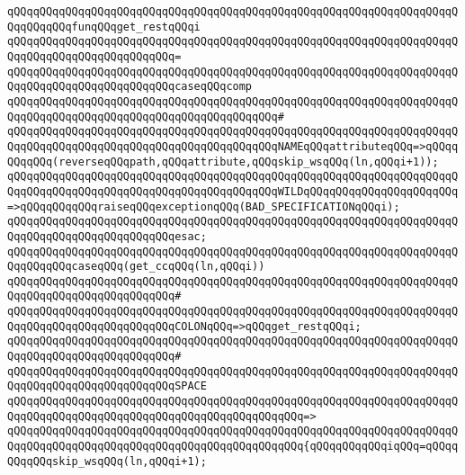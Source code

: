 \newline
\verb|qQQqqQQqqQQqqQQqqQQqqQQqqQQqqQQqqQQqqQQqqQQqqQQqqQQqqQQqqQQqqQQqqQQqqQQqqQQqqQQqfunqQQqget_restqQQqi|\newline
\verb|qQQqqQQqqQQqqQQqqQQqqQQqqQQqqQQqqQQqqQQqqQQqqQQqqQQqqQQqqQQqqQQqqQQqqQQqqQQqqQQqqQQqqQQqqQQqqQQq=|\newline
\verb|qQQqqQQqqQQqqQQqqQQqqQQqqQQqqQQqqQQqqQQqqQQqqQQqqQQqqQQqqQQqqQQqqQQqqQQqqQQqqQQqqQQqqQQqqQQqqQQqcaseqQQqcomp|\newline
\verb|qQQqqQQqqQQqqQQqqQQqqQQqqQQqqQQqqQQqqQQqqQQqqQQqqQQqqQQqqQQqqQQqqQQqqQQqqQQqqQQqqQQqqQQqqQQqqQQqqQQqqQQqqQQqqQQq#|\newline
\verb|qQQqqQQqqQQqqQQqqQQqqQQqqQQqqQQqqQQqqQQqqQQqqQQqqQQqqQQqqQQqqQQqqQQqqQQqqQQqqQQqqQQqqQQqqQQqqQQqqQQqqQQqqQQqqQQqNAMEqQQqattributeqQQq=>qQQqqQQqqQQq(reverseqQQqpath,qQQqattribute,qQQqskip_wsqQQq(ln,qQQqi+1));|\newline
\verb|qQQqqQQqqQQqqQQqqQQqqQQqqQQqqQQqqQQqqQQqqQQqqQQqqQQqqQQqqQQqqQQqqQQqqQQqqQQqqQQqqQQqqQQqqQQqqQQqqQQqqQQqqQQqqQQqWILDqQQqqQQqqQQqqQQqqQQqqQQq=>qQQqqQQqqQQqraiseqQQqexceptionqQQq(BAD_SPECIFICATIONqQQqi);|\newline
\verb|qQQqqQQqqQQqqQQqqQQqqQQqqQQqqQQqqQQqqQQqqQQqqQQqqQQqqQQqqQQqqQQqqQQqqQQqqQQqqQQqqQQqqQQqqQQqqQQqesac;|\newline
\newline
\verb|qQQqqQQqqQQqqQQqqQQqqQQqqQQqqQQqqQQqqQQqqQQqqQQqqQQqqQQqqQQqqQQqqQQqqQQqqQQqqQQqcaseqQQq(get_ccqQQq(ln,qQQqi))|\newline
\verb|qQQqqQQqqQQqqQQqqQQqqQQqqQQqqQQqqQQqqQQqqQQqqQQqqQQqqQQqqQQqqQQqqQQqqQQqqQQqqQQqqQQqqQQqqQQqqQQq#|\newline
\verb|qQQqqQQqqQQqqQQqqQQqqQQqqQQqqQQqqQQqqQQqqQQqqQQqqQQqqQQqqQQqqQQqqQQqqQQqqQQqqQQqqQQqqQQqqQQqqQQqCOLONqQQq=>qQQqget_restqQQqi;|\newline
\verb|qQQqqQQqqQQqqQQqqQQqqQQqqQQqqQQqqQQqqQQqqQQqqQQqqQQqqQQqqQQqqQQqqQQqqQQqqQQqqQQqqQQqqQQqqQQqqQQq#|\newline
\verb|qQQqqQQqqQQqqQQqqQQqqQQqqQQqqQQqqQQqqQQqqQQqqQQqqQQqqQQqqQQqqQQqqQQqqQQqqQQqqQQqqQQqqQQqqQQqqQQqSPACE|\newline
\verb|qQQqqQQqqQQqqQQqqQQqqQQqqQQqqQQqqQQqqQQqqQQqqQQqqQQqqQQqqQQqqQQqqQQqqQQqqQQqqQQqqQQqqQQqqQQqqQQqqQQqqQQqqQQqqQQqqQQq=>|\newline
\verb|qQQqqQQqqQQqqQQqqQQqqQQqqQQqqQQqqQQqqQQqqQQqqQQqqQQqqQQqqQQqqQQqqQQqqQQqqQQqqQQqqQQqqQQqqQQqqQQqqQQqqQQqqQQqqQQqqQQq{qQQqqQQqqQQqiqQQq=qQQqqQQqqQQqskip_wsqQQq(ln,qQQqi+1);|\newline
